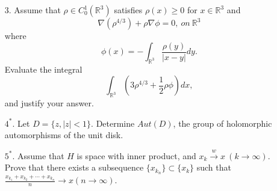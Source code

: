 \documentclass[12pt]{article}
\begin{document}
\begin{itemize}
\vskip 1cm

\item[3.] Assume that  $\rho\in C^1_0 (\mathbb{R}^3)$  satisfies $\rho(x)\ge 0$ for $x\in \mathbb{R}^3$ and
\[ \nabla (\rho^{4/3})+\rho \nabla \phi=0, \ on \  \mathbb{R}^3 \]
where \[\phi(x)=-\int_{\mathbb{R}^3}\frac{\rho(y)}{|x-y|}dy. \]
Evaluate the integral
\[ \int_{\mathbb{R}^3}(3\rho^{4/3}+\frac{1}{2}\rho\phi)dx,\]
and justify your answer.


\newpage

\item[$4^\ast$.] Let $D = \{z, |z| < 1\}$. Determine $Aut(D)$, the group of holomorphic automorphisms of the unit disk.


\vskip 1cm

\item[$5^\ast$.] Assume that $H$ is space with inner product, and $x_{k} \overset{w}{\to}x\ (k\to \infty)$. Prove that there exists a subsequence $\{x_{k_{n}}\} \subset \{x_k\}$ such that $\frac{x_{k_{1}}+x_{k_{2}}+\cdots+x_{k_{n}}}{n}\to x(n\to \infty)$.


\end{itemize}
\end{document}
